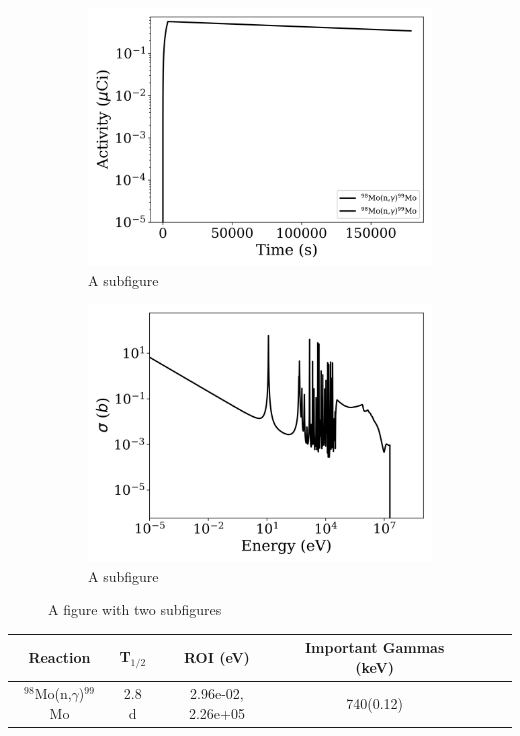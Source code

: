 \begin{figure}[h]
\centering
\begin{subfigure}{.5\textwidth}
  \centering
     \includegraphics[width=.8\textwidth]{plot/Mo-98(n,gamma)Mo-99_wisconsin1} 

  \caption{A subfigure}
  \label{fig:sub1}
\end{subfigure}%
\begin{subfigure}{.5\textwidth}
  \centering
     \includegraphics[width=.8\textwidth]{plot/Mo-98(n,gamma)Mo-99} 

  \caption{A subfigure}
  \label{fig:sub2}
\end{subfigure}
\caption{A figure with two subfigures}
\label{fig:test}
\end{figure}

\begin{table}[h]
\centering
\begin{tabular}{ |c|c|c|c|c|c|c| }
 \hline
 Reaction & T$_{1/2}$ & ROI (eV) & Important Gammas (keV) \\
 \hline 
 $^{98}$Mo(n,$\gamma$)$^{99}$Mo &  2.8 d & 2.96e-02, 2.26e+05 & 740(0.12) \\ 
\hline
\end{tabular}
\end{table}
